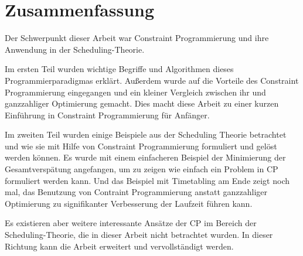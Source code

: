\chapter{Zusammenfassung}

Der Schwerpunkt dieser Arbeit war Constraint Programmierung und ihre Anwendung in der Scheduling-Theorie.

Im ersten Teil wurden wichtige Begriffe und Algorithmen dieses Programmierparadigmas erklärt. Außerdem wurde auf die Vorteile des Constraint Programmierung eingegangen und ein kleiner Vergleich zwischen ihr und ganzzahliger Optimierung gemacht. Dies macht diese Arbeit zu einer kurzen Einführung in Constraint Programmierung für Anfänger. 

Im zweiten Teil wurden einige Beispiele aus der Scheduling Theorie betrachtet und wie sie mit Hilfe von Constraint Programmierung formuliert und gelöst werden können. Es wurde mit einem einfacheren Beispiel der Minimierung der Gesamtverspätung angefangen, um zu zeigen wie einfach ein Problem in CP formuliert werden kann. Und das Beispiel mit Timetabling am Ende zeigt noch mal, das Benutzung von Contraint Programmierung anstatt ganzzahliger Optimierung zu signifikanter Verbesserung der Laufzeit führen kann.

Es existieren aber weitere interessante Ansätze der CP im Bereich der Scheduling-Theorie, die in dieser Arbeit nicht betrachtet wurden. In dieser Richtung kann die Arbeit erweitert und vervollständigt werden. 